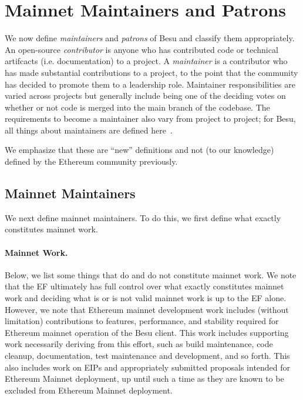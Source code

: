 
\section{Mainnet Maintainers and Patrons} \label{sec:maintainers}
We now define \emph{maintainers} and \emph{patrons} of Besu and classify them appropriately.  An open-source \emph{contributor} is anyone who has contributed code or technical artifcacts (i.e. documentation) to a project.  A \emph{maintainer} is a contributor who has made substantial contributions to a project, to the point that the community has decided to promote them to a leadership role.  Maintainer responsibilities are varied across projects but generally include being one of the deciding votes on whether or not code is merged into the main branch of the codebase.  The requirements to become a maintainer also vary from project to project; for Besu, all things about maintainers are defined here~\cite{BesuM}.  

We emphasize that these are ``new'' definitions and not (to our knowledge) defined by the Ethereum community previously.

\subsection{Mainnet Maintainers}
We next define mainnet maintainers.  To do this, we first define what exactly constitutes mainnet work.  

\paragraph{Mainnet Work.} Below, we list some things that do and do not constitute mainnet work.  We note that the EF ultimately has full control over what exactly constitutes mainnet work and deciding what is or is not valid mainnet work is up to the EF alone.  However, we note that Ethereum mainnet development work includes (without limitation) contributions to features, performance, and stability required for Ethereum mainnet operation of the Besu client. This work includes supporting work necessarily deriving from this effort, such as build maintenance, code cleanup, documentation, test maintenance and development, and so forth. This also includes work on EIPs and appropriately submitted proposals intended for Ethereum Mainnet deployment, up until such a time as they are known to be excluded from Ethereum Mainnet deployment.

